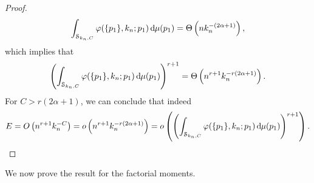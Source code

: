 \begin{proof}
\begin{align*}
\int_{\mathcal{S}_{k_n,C}} \varphi(\{p_1\}, k_n ;p_1) \operatorname{\mathrm{d}\hspace{-2pt}} \mu(p_1) = \Theta\left(n k_n^{-(2\alpha+1)}\right),
\end{align*}
which implies that
\begin{align*}
\left(\int_{\mathcal{S}_{k_n,C}} \varphi(\{p_1\}, k_n ;p_1) \operatorname{\mathrm{d}\hspace{-2pt}} \mu(p_1) \right)^{r+1} 
= \Theta\left(n^{r+1}k_n^{-r(2\alpha+1)}\right).
\end{align*}
For $C>r(2\alpha+1)$, we can conclude that indeed
\begin{align*}
E = O\left(n^{r+1}k_n^{-C}\right)=o\left(n^{r+1}k_n^{-r(2\alpha+1)}\right)=o\left(\left(\int_{\mathcal{S}_{k_n,C}} \varphi(\{p_1\}, k_n ;p_1) \operatorname{\mathrm{d}\hspace{-2pt}} \mu(p_1)\right)^{r+1}\right).
\end{align*}
\end{proof}

We now prove the result for the factorial moments.


